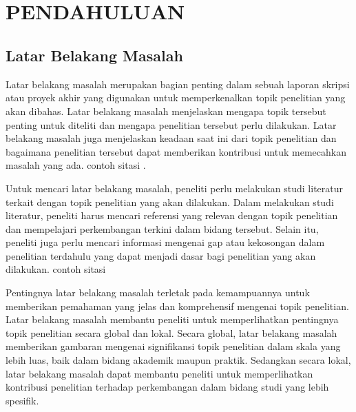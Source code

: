 
\chapter[PENDAHULUAN]{\\ PENDAHULUAN}

\section{Latar Belakang Masalah}
Latar belakang masalah merupakan bagian penting dalam sebuah laporan skripsi atau proyek akhir yang digunakan untuk memperkenalkan topik penelitian yang akan dibahas. Latar belakang masalah menjelaskan mengapa topik tersebut penting untuk diteliti dan mengapa penelitian tersebut perlu dilakukan. Latar belakang masalah juga menjelaskan keadaan saat ini dari topik penelitian dan bagaimana penelitian tersebut dapat memberikan kontribusi untuk memecahkan masalah yang ada. contoh sitasi \cite{mukhlisin2021monitoring}.

Untuk mencari latar belakang masalah, peneliti perlu melakukan studi literatur terkait dengan topik penelitian yang akan dilakukan. Dalam melakukan studi literatur, peneliti harus mencari referensi yang relevan dengan topik penelitian dan mempelajari perkembangan terkini dalam bidang tersebut. Selain itu, peneliti juga perlu mencari informasi mengenai gap atau kekosongan dalam penelitian terdahulu yang dapat menjadi dasar bagi penelitian yang akan dilakukan. contoh sitasi \cite{mukhlisin2021monitoring}

Pentingnya latar belakang masalah terletak pada kemampuannya untuk memberikan pemahaman yang jelas dan komprehensif mengenai topik penelitian. Latar belakang masalah membantu peneliti untuk memperlihatkan pentingnya topik penelitian secara global dan lokal. Secara global, latar belakang masalah memberikan gambaran mengenai signifikansi topik penelitian dalam skala yang lebih luas, baik dalam bidang akademik maupun praktik. Sedangkan secara lokal, latar belakang masalah dapat membantu peneliti untuk memperlihatkan kontribusi penelitian terhadap perkembangan dalam bidang studi yang lebih spesifik. \cite{sihono2021robot}

